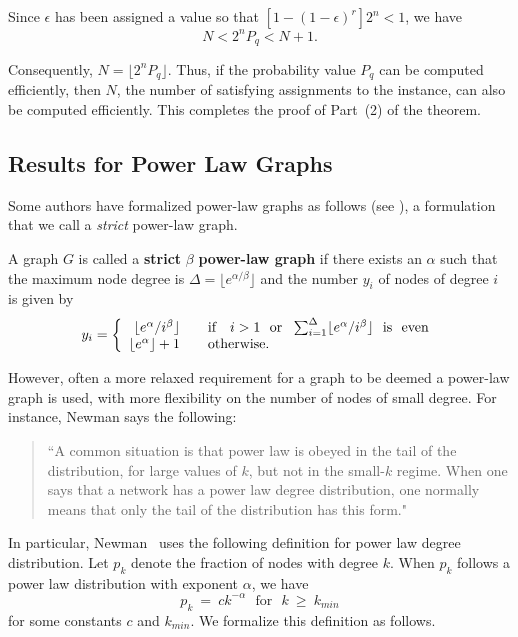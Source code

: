 Since $\epsilon$ has been assigned a value so that 
$[1 - (1 -  \epsilon)^r] 2^n < 1$, we have
$$ N < 2^n  P_q   <  N  + 1.$$

Consequently, $N = \lfloor 2^n  P_q \rfloor.$
Thus, if the probability value $P_q$ can be computed efficiently,
then $N$, the number of satisfying assignments to the 
\mtsat{} instance, can also be computed efficiently.
This completes the proof of Part~(2) of the theorem. \QED

\subsection{Results for Power Law Graphs}
\label{sse:power_law}

Some authors have formalized power-law graphs as follows
(see \cite{ferrante_etal_2008,shen_etal_2012}), 
a formulation that we call a {\em strict} power-law graph.

\begin{definition} \label{def:power-law-graph}
A graph $G$ is called a {\bf strict} $\beta$  \textbf{power-law graph}
if there exists an $\alpha$ such that the maximum node degree is $\Delta = \lfloor e^{\alpha/\beta} \rfloor$
and the number $y_i$ of nodes of degree $i$ is given by 
\[
y_i = \left\{ \begin{array}{r@{\quad \quad}l}
\lfloor e^{\alpha} / i^{\beta} \rfloor  & \mbox{if}~~  ~i > 1~ ~\mbox{or}~~ 
      \sum_{i=1}^{\Delta}  \lfloor e^{\alpha} / i^{\beta} \rfloor~~  \mbox{is~ even}   \\
\lfloor e^{\alpha} \rfloor  + 1 & \mbox{otherwise}.
\end{array} \right.
\]
\end{definition}
However, often a more relaxed requirement for a graph to be deemed
a power-law graph is used, with more flexibility on the number of
nodes of small degree.  
For instance, Newman \cite{newman_2010} says the following:
\begin{quotation}
``A common situation is that power law is obeyed in the
tail of the distribution, for large values of $k$, but not in the
small-$k$ regime.  When one says that a network has a power law
degree distribution, one normally means that only the tail of the
distribution has this form."
\end{quotation}
In particular, Newman~\cite{newman_2010} uses the following definition for power
law degree distribution. 
Let $p_k$ denote the fraction of nodes with degree $k$.
When $p_k$  follows a power law distribution with exponent $\alpha$, we have
$$p_k ~=~ c k^{-\alpha}~~ ~\mbox{for}~~~  k ~\geq~ k_{min}$$
for some constants $c$ and $k_{min}$.
We formalize this definition as follows.

